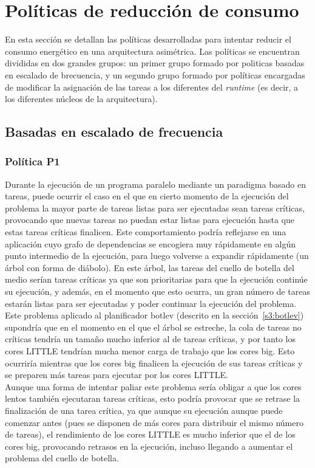 \section{Políticas de reducción de consumo}
En esta sección se detallan las políticas desarrolladas para intentar
reducir el consumo energético en una arquitectura asimétrica. Las políticas
se encuentran divididas en dos grandes grupos: un primer grupo formado por
politicas basadas en escalado de brecuencia, y un segundo grupo formado por
políticas encargadas de modificar la asignación de las tareas a los
diferentes \wts del \emph{runtime} (es decir, a los diferentes núcleos de
la arquitectura).

\subsection[{Basadas en escalado de frecuencia (P1, P2, P2' y P3)}]{Basadas en escalado de frecuencia}


\subsubsection{Política P1}
Durante la ejecución de un programa paralelo mediante un paradigma basado
en tareas, puede ocurrir el caso en el que en cierto momento de la
ejecución del problema la mayor parte de tareas listas para ser ejecutadas
sean tareas críticas, provocando que nuevas tareas no puedan estar listas
para ejecución hasta que estas tareas críticas finalicen. Este
comportamiento podría reflejarse en una aplicación cuyo grafo de
dependencias se encogiera muy rápidamente en algún punto intermedio de la
ejecución, para luego volverse a expandir rápidamente (un árbol con forma
de diábolo). En este árbol, las tareas del cuello de botella del medio
serían tareas críticas ya que son prioritarias para que la ejecución
continúe su ejecución, y además, en el momento que esto ocurra, un gran
número de tareas estarán listas para ser ejecutadas y
poder continuar la ejecución del problema.\\
Este problema aplicado al planificador botlev (descrito en la
sección~\ref{s3:botlev}) supondría que en el momento en el que el árbol se
estreche, la cola de tareas no críticas tendría un tamaño mucho inferior al
de tareas críticas, y por tanto los cores LITTLE tendrían mucha menor carga
de trabajo que los cores big. Esto ocurriría mientras que los cores big
finalicen la ejecución de sus tareas críticas y se preparen más tareas para
ejecutar por los cores LITTLE.\\
Aunque una forma de intentar paliar este problema sería obligar a que los
cores lentos también ejecutaran tareas críticas, esto podría provocar que
se retrase la finalización de una tarea crítica, ya que aunque su ejecución
aunque puede comenzar antes (pues se disponen de más cores para distribuir
el mismo número de tareas), el rendimiento de los cores LITTLE es mucho
inferior que el de los cores big, provocando retrasos en la ejecución,
incluso llegando a aumentar el problema del cuello de botella.

